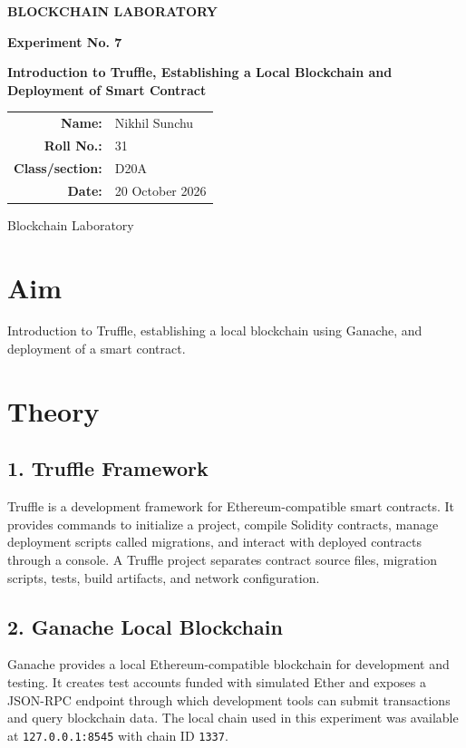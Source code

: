 \documentclass[12pt,a4paper]{article}
\begin{document}
\begin{titlepage}
\centering
\vspace*{1.5cm}
{\Large\bfseries BLOCKCHAIN LABORATORY\par}
\vspace{1.2cm}
{\large\bfseries Experiment No. 7\par}
\vspace{0.8cm}
{\LARGE\bfseries Introduction to Truffle, Establishing a Local Blockchain and Deployment of Smart Contract\par}
\vspace{1.5cm}
\begin{tabular}{rl}
\textbf{Name:} & Nikhil Sunchu \\[0.6cm]
\textbf{Roll No.:} & 31 \\[0.6cm]
\textbf{Class/section:} & D20A \\[0.6cm]
\textbf{Date:} & 20 October 2026 \\[0.6cm]
\end{tabular}
\vfill
{\large Blockchain Laboratory\par}
\end{titlepage}

\section{Aim}
Introduction to Truffle, establishing a local blockchain using Ganache, and deployment of a smart contract.

\section{Theory}
\subsection{1. Truffle Framework}
Truffle is a development framework for Ethereum-compatible smart contracts. It provides commands to initialize a project, compile Solidity contracts, manage deployment scripts called migrations, and interact with deployed contracts through a console. A Truffle project separates contract source files, migration scripts, tests, build artifacts, and network configuration.

\subsection{2. Ganache Local Blockchain}
Ganache provides a local Ethereum-compatible blockchain for development and testing. It creates test accounts funded with simulated Ether and exposes a JSON-RPC endpoint through which development tools can submit transactions and query blockchain data. The local chain used in this experiment was available at \texttt{127.0.0.1:8545} with chain ID \texttt{1337}.
\end{document}
